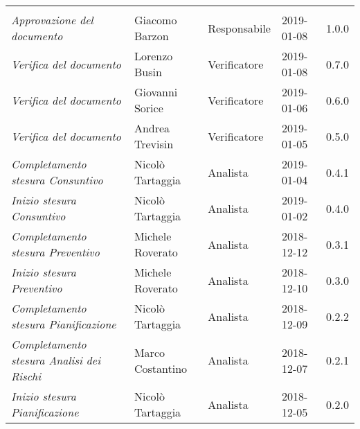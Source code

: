 \newpage 
\section*{}
\begin{table}[H]
	\centering
	\begin{tabular}{p{4cm}|C{3cm}|C{3cm}|R{2.5cm}|R{2cm}}
		
		 & & & & \\
		
		
		\emph{Approvazione del documento} & Giacomo Barzon & Responsabile & 2019-01-08 & 1.0.0 \\
		\hline
		
		\emph{Verifica del documento} & Lorenzo Busin & Verificatore & 2019-01-08 & 0.7.0 \\
		\hline
		
		\emph{Verifica del documento} & Giovanni Sorice & Verificatore & 2019-01-06 & 0.6.0 \\
		\hline
		
		\emph{Verifica del documento} & Andrea Trevisin & Verificatore & 2019-01-05 & 0.5.0 \\
		\hline
		
		\emph{Completamento stesura Consuntivo} & Nicolò Tartaggia & Analista & 2019-01-04 & 0.4.1 \\
		\hline
		
		\emph{Inizio stesura Consuntivo} & Nicolò Tartaggia & Analista & 2019-01-02 & 0.4.0 \\
		\hline
		
		\emph{Completamento stesura Preventivo} & Michele Roverato & Analista & 2018-12-12 & 0.3.1 \\
		\hline
		
		\emph{Inizio stesura Preventivo} & Michele Roverato & Analista & 2018-12-10 & 0.3.0 \\
		\hline
		
		\emph{Completamento stesura Pianificazione} & Nicolò Tartaggia & Analista & 2018-12-09 & 0.2.2 \\
		\hline
		
		\emph{Completamento stesura Analisi dei Rischi} & Marco Costantino & Analista & 2018-12-07 & 0.2.1 \\
		\hline
		
		\emph{Inizio stesura Pianificazione} & Nicolò Tartaggia & Analista & 2018-12-05 & 0.2.0 \\
		\hline
		

\end{tabular}
\end{table}
